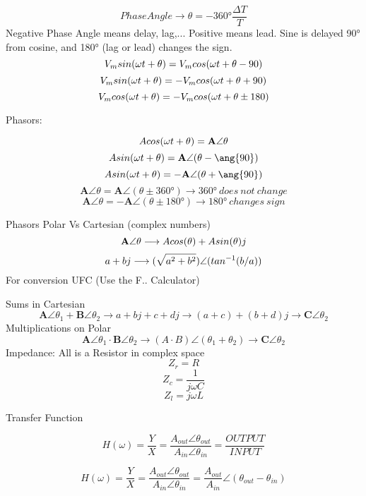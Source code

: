 \documentclass[]{article}
\begin{document}
$$
Phase Angle \longrightarrow \theta=-\ang{360}\frac{\Delta T}{T} 
$$
Negative Phase Angle means delay, lag,... Positive means lead. Sine is delayed \ang{90} from cosine, and \ang{180} (lag or lead) changes the sign.
$$
V_m\\sin(\omega t + \theta) =V_m \\cos(\omega t + \theta -90) $$
$$
V_m\\sin(\omega t + \theta) =-V_m \\cos(\omega t + \theta +90) $$
$$
V_m \\cos(\omega t + \theta) =  -V_m \\cos(\omega t + \theta \pm180) $$

Phasors:

$$
A \\cos(\omega t + \theta)= \textbf{A}\angle \theta
$$
$$
A \\sin(\omega t + \theta)= \textbf{A}\angle (\theta -\ang{90})
$$
$$
A \\sin(\omega t + \theta)= -\textbf{A}\angle( \theta +\ang{90})
$$
$$ \textbf{A}\angle \theta = \textbf{A}\angle (\theta \pm \ang{360} ) \longrightarrow \ang{360}\ does\ not\ change $$
$$ \textbf{A}\angle \theta = -\textbf{A}\angle( \theta \pm \ang{180}) \longrightarrow \ang{180}\ changes\ sign $$

Phasors Polar Vs Cartesian (complex numbers)
$$ \textbf{A}\angle \theta  \longrightarrow A\\cos(\theta) + A\\sin(\theta) j  $$
$$a+bj  \longrightarrow (\sqrt{a^2+b^2})  \angle(\\tan^{-1}(b/a))$$
For conversion UFC (Use the F.. Calculator)

Sums in Cartesian
$$ \textbf{A}\angle \theta_1 + \textbf{B}\angle \theta_2 \longrightarrow a+bj + c+dj \longrightarrow (a+c)+(b+d)j \longrightarrow     \textbf{C}\angle \theta_2 $$
Multiplications on Polar
$$ \textbf{A}\angle \theta_1  \cdot \textbf{B}\angle \theta_2 \longrightarrow (A\cdot B)\angle(\theta_1+\theta_2) \longrightarrow     \textbf{C}\angle \theta_2 $$
Impedance: All is a Resistor in complex space
$$ Z_r = R$$ 
$$ Z_c= \frac{1}{j\omega C} $$
$$ Z_l=j \omega L $$

Transfer Function

$$ H(\omega)=\frac{Y}{X}=\frac{A_{out}\angle\theta _{out}}{A_{in}\angle\theta _{in}} =\frac{OUTPUT}{INPUT} $$

$$ H(\omega)=\frac{Y}{X}= \frac{A_{out}\angle\theta _{out}}{A_{in}\angle\theta _{in}} = \frac{A_{out}}{A_{in}} \angle(\theta_{out}-\theta_{in})$$
\end{document}
